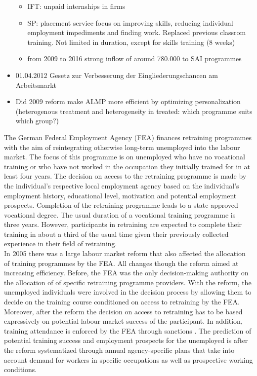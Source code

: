 \begin{itemize}
\begin{itemize}
        \item IFT: unpaid internships in firms
        \item SP: placement service focus on improving skills, reducing individual employment impediments and finding work. Replaced previous classrom training. Not limited in duration, except for skills training (8 weeks)
        \item from 2009 to 2016 strong inflow of around 780.000 to SAI programmes \citep{harrer2019free}
    \end{itemize}
    \item 01.04.2012 Gesetz zur Verbesserung der Eingliederungschancen am Arbeitsmarkt
    \item Did 2009 reform make ALMP more efficient by optimizing personalization (heterogenous treatment and heterogeneity in treated: which programme suits which group?)
\end{itemize}

The German Federal Employment Agency (FEA) finances retraining programmes with the aim of reintegrating otherwise long-term unemployed into the labour market. The focus of this programme is on unemployed who have no vocational training or who have not worked in the occupation they initially trained for in at least four years. The decision on access to the retraining programme is made by the individual's respective local employment agency based on the individual's employment history, educational level, motivation and potential employment prospects. Completion of the retraining programme leads to a state-approved vocational degree. The usual duration of a vocational training programme is three years. However, participants in retraining are expected to complete their training in about a third of the usual time given their previously collected experience in their field of retraining.\\

In 2005 there was a large labour market reform that also affected the allocation of training programmes by the FEA. All changes though the reform aimed at increasing efficiency. Before, the FEA was the only decision-making authority on the allocation of of specific retraining programme providers. With the reform, the unemployed individuals were involved in the decision process by allowing them to decide on the training course conditioned on access to retraining by the FEA. Moreover, after the reform the decision on access to retraining has to be based expressively on potential labour market success of the participant. In addition, training attendance is enforced by the FEA through sanctions \citep{Doerr2017}. The prediction of potential training success and employment prospects for the unemployed is after the reform systematized through annual agency-specific plans that take into account demand for workers in specific occupations as well as prospective working conditions. 